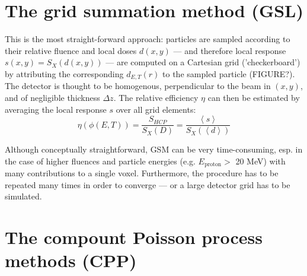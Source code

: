 \section{The grid summation method (GSL)}
This is the most straight-forward approach: particles are sampled according to their relative fluence and local doses $d(x,y)$ --- and therefore local response $s(x,y)=S_X(d(x,y))$ --- are computed on a Cartesian grid ('checkerboard') by attributing the corresponding $d_{E,T}(r)$ to the sampled particle (FIGURE?). The detector is thought to be homogenous, perpendicular to the beam in $(x,y)$, and of negligible thickness $\Delta z$. The relative efficiency $\eta$ can then be estimated by averaging the local response $s$ over all grid elements:
\begin{equation}\label{eq:eta}
	\eta(\phi(E, T))=\frac{S_{HCP}}{S_X(D)}=\frac{\left\langle s\right\rangle}{S_X(\left\langle d\right\rangle)}
\end{equation}

Although conceptually straightforward, GSM can be very time-consuming, esp. in the case of higher fluences and particle energies (e.g. $E_{\mbox{proton}} >$ 20 MeV) with many contributions to a single voxel. Furthermore, the procedure has to be repeated many times in order to converge --- or a large detector grid has to be simulated. 


\section{The compount Poisson process methods (CPP)}


